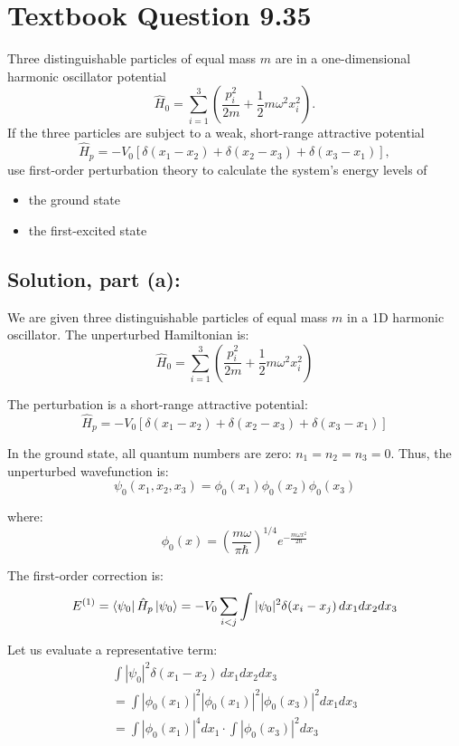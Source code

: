 \documentclass[12pt]{article}
\begin{document}
\section{Textbook Question 9.35}
    Three distinguishable particles of equal mass \( m \) are in a one-dimensional harmonic oscillator potential
    \[
        \hat{H}_0 = \sum_{i=1}^{3} \left( \frac{p_i^2}{2m} + \frac{1}{2} m \omega^2 x_i^2 \right).
    \]
    If the three particles are subject to a weak, short-range attractive potential
    \[
        \hat{H}_p = -V_0 \left[ \delta(x_1 - x_2) + \delta(x_2 - x_3) + \delta(x_3 - x_1) \right],
    \]
    use first-order perturbation theory to calculate the system’s energy levels of \\
    \begin{itemize}
        \item [(a)] the ground state
        \item [(b)] the first-excited state
    \end{itemize}

    \subsection{Solution, part (a):}
        We are given three distinguishable particles of equal mass \( m \) in a 1D harmonic oscillator. The unperturbed Hamiltonian is:
        \[
            \hat{H}_0 = \sum_{i=1}^{3} \left( \frac{p_i^2}{2m} + \frac{1}{2} m\omega^2 x_i^2 \right)
        \]
        
        The perturbation is a short-range attractive potential:
        \[
            \hat{H}_p = -V_0 \left[ \delta(x_1 - x_2) + \delta(x_2 - x_3) + \delta(x_3 - x_1) \right]
        \]
        
        In the ground state, all quantum numbers are zero: \( n_1 = n_2 = n_3 = 0 \). Thus, the unperturbed wavefunction is:
        \[
            \psi_0(x_1, x_2, x_3) = \phi_0(x_1) \phi_0(x_2) \phi_0(x_3)
        \]
        
        where:
        \[
            \phi_0(x) = \left( \frac{m\omega}{\pi\hbar} \right)^{1/4} e^{- \frac{m\omega x^2}{2\hbar} }
        \]
        
        The first-order correction is:
        \[
            E^{(1)} = \bra{\psi_0} \hat{H}_p \ket{\psi_0} = -V_0 \sum_{i<j} \int |\psi_0|^2 \delta(x_i - x_j) \, dx_1 dx_2 dx_3
        \]
        
        Let us evaluate a representative term:
        \begin{equation}
            \begin{split}
                \int |\psi_0|^2 \delta(x_1 - x_2) \, dx_1 dx_2 dx_3 \\ 
                = \int |\phi_0(x_1)|^2 |\phi_0(x_1)|^2 |\phi_0(x_3)|^2 dx_1 dx_3 \\
                = \int |\phi_0(x_1)|^4 dx_1 \cdot \int |\phi_0(x_3)|^2 dx_3
            \end{split}
        \end{equation}
                
\end{document}
